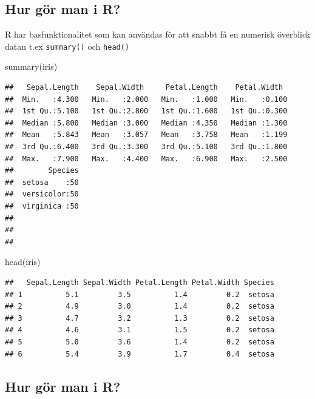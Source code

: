 \documentclass[
]{book}
\newenvironment{Shaded}{\begin{snugshade}}{\end{snugshade}}
\newcommand{\FunctionTok}[1]{\textcolor[rgb]{0.00,0.00,0.00}{#1}}
\newcommand{\NormalTok}[1]{#1}
\begin{document}
\hypertarget{hur-guxf6r-man-i-r}{%
\subsection{Hur gör man i R?}\label{hur-guxf6r-man-i-r}}

R har basfunktionalitet som kan användas för att snabbt få en numerisk överblick datan t.ex
\texttt{summary()} och \texttt{head()}

\begin{Shaded}
\begin{Highlighting}[]
\FunctionTok{summary}\NormalTok{(iris)}
\end{Highlighting}
\end{Shaded}

\begin{verbatim}
##   Sepal.Length    Sepal.Width     Petal.Length    Petal.Width   
##  Min.   :4.300   Min.   :2.000   Min.   :1.000   Min.   :0.100  
##  1st Qu.:5.100   1st Qu.:2.800   1st Qu.:1.600   1st Qu.:0.300  
##  Median :5.800   Median :3.000   Median :4.350   Median :1.300  
##  Mean   :5.843   Mean   :3.057   Mean   :3.758   Mean   :1.199  
##  3rd Qu.:6.400   3rd Qu.:3.300   3rd Qu.:5.100   3rd Qu.:1.800  
##  Max.   :7.900   Max.   :4.400   Max.   :6.900   Max.   :2.500  
##        Species  
##  setosa    :50  
##  versicolor:50  
##  virginica :50  
##                 
##                 
## 
\end{verbatim}

\begin{Shaded}
\begin{Highlighting}[]
\FunctionTok{head}\NormalTok{(iris)}
\end{Highlighting}
\end{Shaded}

\begin{verbatim}
##   Sepal.Length Sepal.Width Petal.Length Petal.Width Species
## 1          5.1         3.5          1.4         0.2  setosa
## 2          4.9         3.0          1.4         0.2  setosa
## 3          4.7         3.2          1.3         0.2  setosa
## 4          4.6         3.1          1.5         0.2  setosa
## 5          5.0         3.6          1.4         0.2  setosa
## 6          5.4         3.9          1.7         0.4  setosa
\end{verbatim}

\hypertarget{hur-guxf6r-man-i-r-1}{%
\subsection{Hur gör man i R?}\label{hur-guxf6r-man-i-r-1}}
\end{document}

